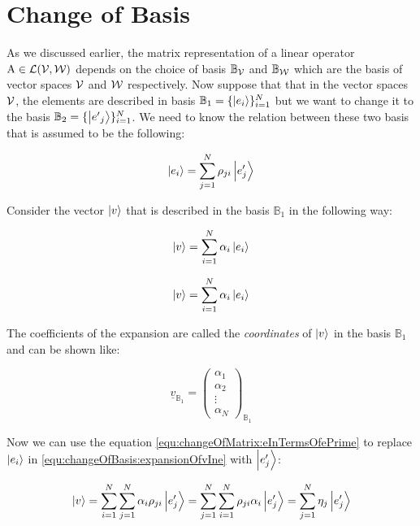 \section{Change of Basis}

As we discussed earlier, the matrix representation of a linear operator $\operatorname{A} \in \mathcal{L}(\mathcal{V},\mathcal{W})$ depends on the choice of basis $\mathbb{B}_{\mathcal{V}}$ and $\mathbb{B}_{\mathcal{W}}$ which are the basis of vector spaces $\mathcal{V}$ and $ \mathcal{W} $ respectively. Now suppose that that in the vector spaces $\mathcal{V}$, the elements are described in basis $\mathbb{B}_1 = \{ \ket{e_i} \}_{i=1}^{N}$ but we want to change it to the basis $\mathbb{B}_{2} = \{ \ket{{e'}_{j}} \}_{i=1}^{N}$. We need to know the relation between these two basis that is assumed to be the following:

\begin{equation}
	\ket{e_i} = \sum_{j=1}^{N} \rho_{ji} \ket{e'_{j}}
	\label{equ:changeOfMatrix:eInTermsOfePrime}
\end{equation}

Consider the vector $\ket{v}$ that is described in the basis $\mathbb{B}_1$ in the following way: 

\begin{equation}
	\ket{v} = \sum_{i=1}^{N} \alpha_i \ket{e_i} 
	\label{equ:changeOfBasis:expansionOfvIne}
\end{equation}

\[ \ket{v} = \sum_{i=1}^{N} \alpha_i \ket{e_i} \] 

The coefficients of the expansion are called the \emph{coordinates} of $\ket{v}$ in the basis $\mathbb{B}_1$ and can be shown like:

\begin{equation}
	\underline{v}_{\mathbb{B}_1} = \begin{pmatrix}
		\alpha_1 \\
		\alpha_2 \\
		\vdots \\
		\alpha_N
	\end{pmatrix}_{\mathbb{B}_1}
\end{equation}

Now we can use the equation \ref{equ:changeOfMatrix:eInTermsOfePrime} to replace $\ket{e_i}$ in \ref{equ:changeOfBasis:expansionOfvIne} with $\ket{e'_j}$:

\begin{equation}
	\ket{v} = \sum_{i=1}^{N} \sum_{j=1}^{N}\alpha_i \rho_{ji} \ket{e'_j} = \sum_{j=1}^{N} \sum_{i=1}^{N}\rho_{ji} \alpha_i  \ket{e'_j}  = \sum_{j=1}^{N} \eta_j \ket{e'_j}
	\label{equ:chanbeOfBasis:vInNewBasis}
\end{equation}


